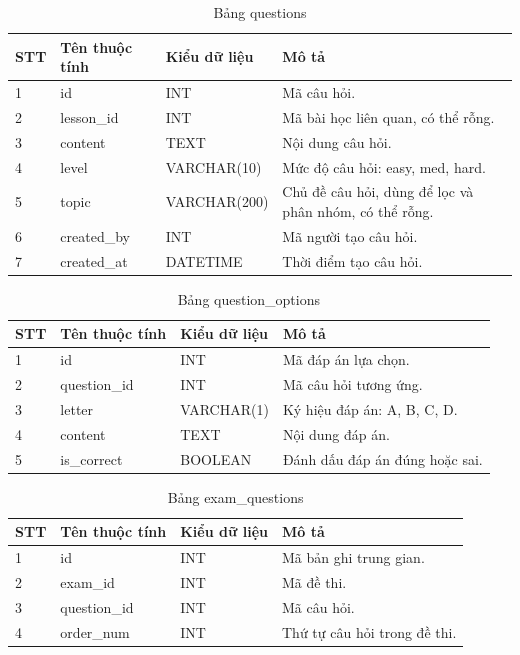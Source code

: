 \documentclass[12pt,a4paper]{article}
\begin{document}
	\begin{table}[H]
		\centering
		\caption{Bảng questions}
		\label{tab:questions}
		\begin{tabular}{|p{1.5cm}|p{4cm}|p{4cm}|p{5.5cm}|}
			\hline
			\centering\textbf{STT} & \centering\textbf{Tên thuộc tính} & \centering\textbf{Kiểu dữ liệu} & \centering\arraybackslash\textbf{Mô tả} \\
			\hline
			1 & id & INT & Mã câu hỏi. \\
			\hline
			2 & lesson\_id & INT & Mã bài học liên quan, có thể rỗng. \\
			\hline
			3 & content & TEXT & Nội dung câu hỏi. \\
			\hline
			4 & level & VARCHAR(10) & Mức độ câu hỏi: easy, med, hard. \\
			\hline
			5 & topic & VARCHAR(200) & Chủ đề câu hỏi, dùng để lọc và phân nhóm, có thể rỗng. \\
			\hline
			6 & created\_by & INT & Mã người tạo câu hỏi. \\
			\hline
			7 & created\_at & DATETIME & Thời điểm tạo câu hỏi. \\
			\hline
		\end{tabular}
	\end{table}
	
	\begin{table}[H]
		\centering
		\caption{Bảng question\_options}
		\label{tab:question_options}
		\begin{tabular}{|p{1.5cm}|p{4cm}|p{4cm}|p{5.5cm}|}
			\hline
			\centering\textbf{STT} & \centering\textbf{Tên thuộc tính} & \centering\textbf{Kiểu dữ liệu} & \centering\arraybackslash\textbf{Mô tả} \\
			\hline
			1 & id & INT & Mã đáp án lựa chọn. \\
			\hline
			2 & question\_id & INT & Mã câu hỏi tương ứng. \\
			\hline
			3 & letter & VARCHAR(1) & Ký hiệu đáp án: A, B, C, D. \\
			\hline
			4 & content & TEXT & Nội dung đáp án. \\
			\hline
			5 & is\_correct & BOOLEAN & Đánh dấu đáp án đúng hoặc sai. \\
			\hline
		\end{tabular}
	\end{table}
	
	\begin{table}[H]
		\centering
		\caption{Bảng exam\_questions}
		\label{tab:exam_questions}
		\begin{tabular}{|p{1.5cm}|p{4cm}|p{4cm}|p{5.5cm}|}
			\hline
			\centering\textbf{STT} & \centering\textbf{Tên thuộc tính} & \centering\textbf{Kiểu dữ liệu} & \centering\arraybackslash\textbf{Mô tả} \\
			\hline
			1 & id & INT & Mã bản ghi trung gian. \\
			\hline
			2 & exam\_id & INT & Mã đề thi. \\
			\hline
			3 & question\_id & INT & Mã câu hỏi. \\
			\hline
			4 & order\_num & INT & Thứ tự câu hỏi trong đề thi. \\
			\hline
		\end{tabular}
	\end{table}
	
\end{document}
